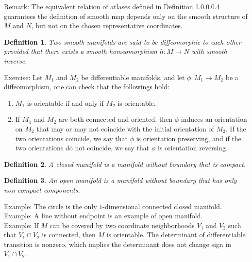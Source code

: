\documentclass[11pt]{book}
\theoremstyle{break}
\theoremstyle{break}
\newtheorem{defn}{Definition}[corL]
\newcommand{\remark}{\color{blue}Remark: \color{black}}
\newcommand{\example}{\color{green}Example: \color{black}}
\newcommand{\exercise}{\color{green}Exercise: \color{black}}
\begin{document}
\remark The equivalent relation of atlases defined in Definition 1.0.0.0.4 guarantees the definition of smooth map depends only on the smooth structure of $M$ and $N$, but not on the chosen representative coordinates. 

\begin{defn}
Two smooth manifolds are said to be diffeomorphic to each other provided that there exists a smooth homeomorphism $h:M \to N$ with smooth inverse. 
\end{defn}

\exercise Let $M_1$ and $M_2$ be differentiable manifolds, and let $\phi: M_1 \to M_2$ be a diffeomorphism, one can check that the followings hold:
\begin{enumerate}[topsep=3pt,itemsep=-1ex,partopsep=1ex,parsep=1ex]
\item $M_1$ is orientable if and only if $M_2$ is orientable.
\item If $M_1$ and $M_2$ are both connected and oriented, then $\phi$ induces an orientation on $M_2$ that may or may not coincide with the initial orientation of $M_2$. If the two orientations coincide, we say that $\phi$ is orientation preserving, and if the two orientations do not coincide, we say that $\phi$ is orientation reversing. 
\end{enumerate}


\begin{defn}
A closed manifold is a manifold without boundary that is compact.
\end{defn}
\begin{defn}
An open manifold is a manifold without boundary that has only non-compact components. 
\end{defn}

\example The circle is the only $1$-dimensional connected closed manifold. \\
\example A line without endpoint is an example of open manifold. \\

\example If $M$ can be covered by two coordinate neighborhoods $V_1$ and $V_2$ such that $V_1 \cap V_2$ is connected, then $M$ is orientable. The determinant of differentiable transition is nonzero, which implies the determinant does not change sign in $V_1 \cap V_2$.\\
\end{document}
